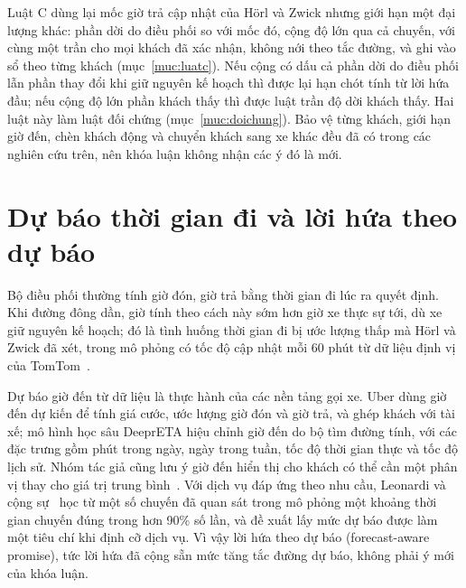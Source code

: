 Luật C dùng lại mốc giờ trả cập nhật của Hörl và Zwick nhưng giới hạn một đại lượng khác: phần dời do điều phối so với
mốc đó, cộng độ lớn qua cả chuyến, với cùng một trần cho mọi khách đã xác nhận, không nới theo tắc đường, và ghi vào sổ
theo từng khách (mục~\ref{muc:luatc}). Nếu cộng có dấu cả phần dời do điều phối lẫn phần thay đổi khi giữ nguyên kế
hoạch thì được lại hạn chót tính từ lời hứa đầu; nếu cộng độ lớn phần khách thấy thì được luật trần độ dời khách thấy.
Hai luật này làm luật đối chứng (mục~\ref{muc:doichung}). Bảo vệ từng khách, giới hạn giờ đến, chèn khách động và
chuyển khách sang xe khác đều đã có trong các nghiên cứu trên, nên khóa luận không nhận các ý đó là mới.

\section{Dự báo thời gian đi và lời hứa theo dự báo}
\label{muc:c2-dubao}

Bộ điều phối thường tính giờ đón, giờ trả bằng thời gian đi lúc ra quyết định. Khi đường đông dần, giờ tính theo cách
này sớm hơn giờ xe thực sự tới, dù xe giữ nguyên kế hoạch; đó là tình huống thời gian đi bị ước lượng thấp mà Hörl và
Zwick đã xét, trong mô phỏng có tốc độ cập nhật mỗi 60 phút từ dữ liệu định vị của TomTom~\cite{horl2022}.

Dự báo giờ đến từ dữ liệu là thực hành của các nền tảng gọi xe. Uber dùng giờ đến dự kiến để tính giá cước, ước lượng
giờ đón và giờ trả, và ghép khách với tài xế; mô hình học sâu DeeprETA hiệu chỉnh giờ đến do bộ tìm đường tính, với
các đặc trưng gồm phút trong ngày, ngày trong tuần, tốc độ thời gian thực và tốc độ lịch sử. Nhóm tác giả cũng lưu ý
giờ đến hiển thị cho khách có thể cần một phân vị thay cho giá trị trung bình~\cite{hu2022}. Với dịch vụ đáp ứng theo
nhu cầu, Leonardi và cộng sự~\cite{leonardi2024} học từ một số chuyến đã quan sát trong mô phỏng một khoảng thời gian
chuyến đúng trong hơn 90\% số lần, và đề xuất lấy mức dự báo được làm một tiêu chí khi định cỡ dịch vụ. Vì vậy lời hứa
theo dự báo (forecast-aware promise), tức lời hứa đã cộng sẵn mức tăng tắc đường dự báo, không phải ý mới của khóa
luận.

